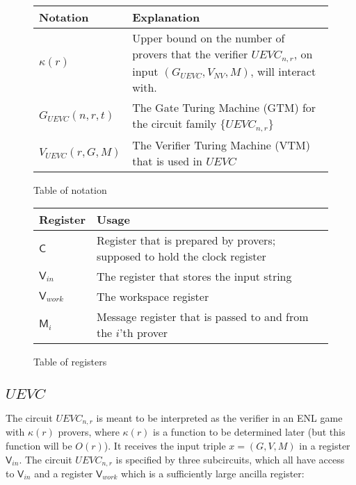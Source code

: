 \documentclass[11pt,letterpaper]{article}
\newcommand{\sC}{{\mathsf{C}}}
\newcommand{\sV}{{\mathsf{V}}}
\newcommand{\sM}{{\mathsf{M}}}
\begin{document}
\begin{figure}[H]
\begin{center}
    \begin{tabular}{ | l | p{10cm} |}
    \hline
    \textbf{Notation} & \textbf{Explanation} \\ \hline
    $\kappa(r)$ 		& Upper bound on the number of provers that the verifier $UEVC_{n,r}$, on input $(G_{UEVC},V_{NV},M)$, will interact with.  \\ \hline
    
    $G_{UEVC}(n,r,t)$ 			& The Gate Turing Machine (GTM) for the circuit family $\{ UEVC_{n,r} \}$ \\ \hline
    
    $V_{UEVC}(r,G,M)$			& The Verifier Turing Machine (VTM) that is used in $UEVC$ \\ \hline
    \end{tabular}
\end{center}
\caption{Table of notation}
\end{figure}

\begin{figure}[H]
\begin{center}
    \begin{tabular}{ | l | p{10cm} |}
    \hline
    \textbf{Register} & \textbf{Usage}\\ \hline
    $\sC$			& Register that is prepared by provers; supposed to hold the clock register 			\\ \hline
    $\sV_{in}$ 		& The register that stores the input string 	 \\ \hline
    $\sV_{work}$	& The workspace register 									\\ \hline
    $\sM_i$			& Message register that is passed to and from  the $i$'th prover	  \\ \hline
    \end{tabular}
\end{center}
\caption{Table of registers}
\end{figure}

\subsection{$UEVC$}

\label{sec:specs}

The circuit $UEVC_{n,r}$ is meant to be interpreted as the verifier in an ENL game with $\kappa(r)$ provers, where $\kappa(r)$ is a function to be determined later (but this function will be $O(r)$). It receives the input triple $x = (G,V,M)$ in a register $\sV_{in}$. The circuit $UEVC_{n,r}$ is specified by three subcircuits, which all have access to $\sV_{in}$ and a register $\sV_{work}$ which is a sufficiently large ancilla register:
\end{document}
